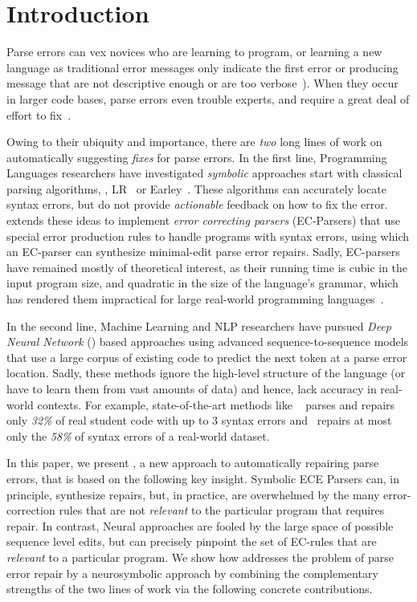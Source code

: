 
\section{Introduction}
\label{sec:intro}

Parse errors can vex novices who
are learning to program, or learning a
new language as traditional error messages
only indicate the first error or producing message
that are not descriptive enough or are too
verbose~\citep{qian2017, VanDerSpek_2005}).
%
When they occur in larger code bases, parse errors
even trouble experts, and require a great deal of
effort to fix~\citep{Denny_2012, Ahadi_2018, Kummerfeld2003}.

Owing to their ubiquity and importance, there are \emph{two}
long lines of work on automatically suggesting \emph{fixes}
for parse errors.
%
In the first line, Programming Languages researchers
have investigated \emph{symbolic} approaches start
with classical parsing algorithms, \eg, LR~\citep{Aho1974}
or Earley~\citep{Earley_1970}.
%
These algorithms can accurately locate syntax errors,
but do not provide \emph{actionable} feedback on how
to fix the error.
%
\citet{Aho_1972} extends these ideas to implement
\emph{error correcting parsers} (EC-Parsers) that
use special error production rules to handle
programs with syntax errors, using which an EC-parser
can synthesize minimal-edit parse error repairs.
%
Sadly, EC-parsers have remained mostly of theoretical
interest, as their running time is cubic in the input
program size, and quadratic in the size of the language's
grammar, which has rendered them impractical for large
real-world programming languages~\citep{McLean1996, Rajasekaran2014}.

In the second line, Machine Learning and NLP researchers have
pursued \emph{Deep Neural Network} (\dnn)
based approaches using advanced sequence-to-sequence
models \citep{Sutskever_2014, Hardalov_2018}
that use a large corpus of existing code to predict
the next token \eg at a parse error location.
%
Sadly, these methods ignore the high-level structure
of the language (or have to learn them from vast amounts
of data) and hence, lack accuracy in real-world contexts.
%
For example, state-of-the-art methods like ~\citep{Ahmed_2021}
parses and repairs only \emph{32\%} of real student code with
up to 3 syntax errors and~\citep{Wu2020} repairs at most only
the \emph{58\%} of syntax errors of a real-world dataset.

In this paper, we present \toolname, a new approach
to automatically repairing parse errors, that is
based on the following key insight.
%
Symbolic ECE Parsers \citep{Aho_1972} can, in principle,
synthesize repairs, but, in practice, are overwhelmed by
the many error-correction rules that are not \emph{relevant}
to the particular program that requires repair.
%
In contrast, Neural approaches are fooled by the large
space of possible sequence level edits, but can precisely
pinpoint the set of EC-rules that are \emph{relevant}
to a particular program.
%
We show how \toolname addresses the problem of parse error
repair by a neurosymbolic approach by combining the
complementary strengths of the two lines of work via
the following concrete contributions.

